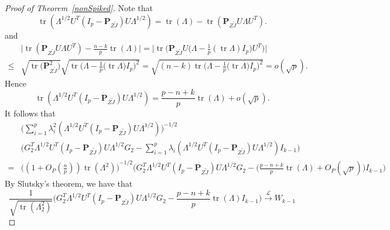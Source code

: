 \documentclass[12pt]{article} %
\DeclareMathOperator{\mytr}{tr}
\newcommand{\bP}{\mathbf{P}}
\theoremstyle{definition}
\begin{document}
\begin{proof}[\textrm{Proof of Theorem~\ref{nonSpiked}}]
Note that
    $$
    \mytr(\Lambda^{1/2}U^T (I_p-\bP_{Z\tilde{J}})U\Lambda^{1/2})
    =
    \mytr(\Lambda)-\mytr(\bP_{Z\tilde{J}}U\Lambda U^T).
    $$ 
and
    $$
    \begin{aligned}
        &
        \big|
    \mytr(\bP_{Z\tilde{J}}U\Lambda U^T)
    -\frac{n-k}{p}\mytr(\Lambda)
    \big|
    =
    \big|
    \mytr\Big(\bP_{Z\tilde{J}} U \big(\Lambda-\frac{1}{p} (\mytr \Lambda) I_p \big) U^T\Big)
    \big|
        \\
        \leq &
        \sqrt{\mytr \big(\bP_{Z\tilde{J}}^2\big)}
        \sqrt{\mytr \Big(\Lambda-\frac{1}{p}\big(\mytr \Lambda\big) I_p\Big)^2}
        =\sqrt{(n-k)\mytr \Big(\Lambda-\frac{1}{p}\big(\mytr \Lambda\big) I_p\Big)^2}
        =o(\sqrt{p}).
    \end{aligned}
    $$
    Hence 
    $$
    \mytr(\Lambda^{1/2}U^T (I_p-\bP_{Z\tilde{J}})U\Lambda^{1/2})
    =
    \frac{p-n+k}{p}\mytr(\Lambda)+o(\sqrt{p}).
    $$
    It follows that
    $$
    \begin{aligned}
        &\Big(\sum_{i=1}^p \lambda_i^2(\Lambda^{1/2}U^T(I_p-\bP_{Z\tilde{J}})U\Lambda^{1/2})\Big)^{-1/2}\\
        &{\Big( G_2^T \Lambda^{1/2}U^T (I_p-\bP_{Z\tilde{J}})U\Lambda^{1/2}G_2-\sum_{i=1}^p \lambda_i(\Lambda^{1/2}U^T(I_p-\bP_{Z\tilde{J}})U\Lambda^{1/2})I_{k-1}\Big)}\\
        =&
        {\Big( (1+O_P(\frac{n}{p}))\mytr (\Lambda^2)\Big) }^{-1/2} {\Big( G_2^T \Lambda^{1/2}U^T (I_p-\bP_{Z\tilde{J}})U\Lambda^{1/2}G_2-
        \big(\frac{p-n+k}{p}\mytr(\Lambda)+O_P(\sqrt{p})\big)I_{k-1}
        \Big)}
    \end{aligned}
    $$
    By Slutsky's theorem, we have that
    $$
    \frac{1}{\sqrt{\mytr(\Lambda_2^2)}}
    {\Big( G_2^T \Lambda^{1/2}U^T (I_p-\bP_{Z\tilde{J}})U\Lambda^{1/2}G_2-
        \frac{p-n+k}{p}\mytr(\Lambda)I_{k-1}\Big)}
    \xrightarrow{\mathcal{L}}W_{k-1}
    $$


\end{proof}
\end{document}
